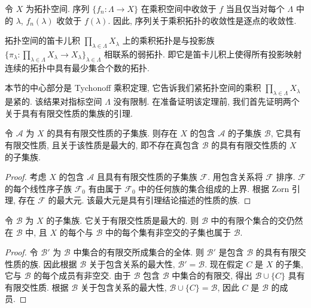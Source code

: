 \documentclass[../../main.tex]{subfiles}
\begin{document}
\begin{proposition}\label{proposition:ch12-乘积逐点收敛}
令 $X$ 为拓扑空间. 序列 $\{f_{n}:\Lambda\to X\}$ 在乘积空间中收敛于 $f$ 当且仅当对每个 $\Lambda$ 中的 $\lambda$, $f_{n}(\lambda)$ 收敛于 $f(\lambda)$. 因此, 序列关于乘积拓扑的收敛性是逐点的收敛性.
\end{proposition}

\begin{proposition}\label{proposition:ch12-乘积弱拓扑}
拓扑空间的笛卡儿积 $\prod_{\lambda\in\Lambda}X_{\lambda}$ 上的乘积拓扑是与投影族 $\{\pi_{\lambda}:\prod_{\lambda\in\Lambda}X_{\lambda}\to X_{\lambda}\}_{\lambda\in\Lambda}$ 相联系的弱拓扑. 即它是笛卡儿积上使得所有投影映射连续的拓扑中具有最少集合个数的拓扑.
\end{proposition}

本节的中心部分是 Tychonoff 乘积定理, 它告诉我们紧拓扑空间的乘积 $\prod_{\lambda\in\Lambda}X_{\lambda}$ 是紧的. 该结果对指标空间 $\Lambda$ 没有限制. 在准备证明该定理前, 我们首先证明两个关于具有有限交性质的集族的引理.

\begin{lemma}\label{lemma:ch12-极大有限交}
令 $\mathcal{A}$ 为 $X$ 的具有有限交性质的子集族. 则存在 $X$ 的包含 $\mathcal{A}$ 的子集族 $\mathcal{B}$, 它具有有限交性质, 且关于该性质是最大的, 即不存在真包含 $\mathcal{B}$ 的具有有限交性质的 $X$ 的子集族.
\end{lemma}

\begin{proof}
考虑 $X$ 的包含 $\mathcal{A}$ 且具有有限交性质的子集族 $\mathcal{F}$. 用包含关系将 $\mathcal{F}$ 排序. $\mathcal{F}$ 的每个线性序子族 $\mathcal{F}_{0}$ 有由属于 $\mathcal{F}_{0}$ 中的任何族的集合组成的上界. 根据 Zorn 引理, 存在 $\mathcal{F}$ 的最大元. 该最大元是具有引理结论描述的性质的族.
\end{proof}

\begin{lemma}\label{lemma:ch12-极大有限交性质}
令 $\mathcal{B}$ 为 $X$ 的子集族. 它关于有限交性质是最大的. 则 $\mathcal{B}$ 中的有限个集合的交仍然在 $\mathcal{B}$ 中, 且 $X$ 的每个与 $\mathcal{B}$ 中的每个集有非空交的子集也属于 $\mathcal{B}$.
\end{lemma}

\begin{proof}
令 $\mathcal{B}'$ 为 $\mathcal{B}$ 中集合的有限交所成集合的全体. 则 $\mathcal{B}'$ 是包含 $\mathcal{B}$ 的具有有限交性质的族. 因此根据 $\mathcal{B}$ 关于包含关系的最大性, $\mathcal{B}'=\mathcal{B}$. 现在假定 $C$ 是 $X$ 的子集, 它与 $\mathcal{B}$ 的每个成员有非空交. 由于 $\mathcal{B}$ 包含 $\mathcal{B}$ 中集合的有限交, 得出 $\mathcal{B}\cup\{C\}$ 具有有限交性质. 根据 $\mathcal{B}$ 关于包含关系的最大性, $\mathcal{B}\cup\{C\}=\mathcal{B}$, 因此 $C$ 是 $\mathcal{B}$ 的成员.
\end{proof}
\end{document}
